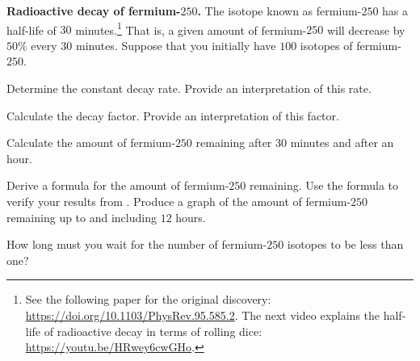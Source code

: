 \documentclass[a4paper,oneside,12pt]{article}
\begin{document}
\begin{exercise}
\textbf{Radioactive decay of fermium-$250$.}
The isotope known as fermium-$250$ has a half-life of $30$
minutes.\footnote{
  See the following paper for the original discovery:
  \url{https://doi.org/10.1103/PhysRev.95.585.2}.  The next video
  explains the half-life of radioactive decay in terms of rolling
  dice:
  \url{https://youtu.be/HRwey6cwGHo}.
}
That is, a given amount of fermium-$250$ will decrease by $50\%$ every
$30$ minutes.  Suppose that you initially have $100$ isotopes of
fermium-$250$.
\begin{packedenum}
\item\label{subex:exponential:fermium250_decay_rate}
  Determine the constant decay rate.  Provide an interpretation of
  this rate.

\item\label{subex:exponential:fermium250_decay_factor}
  Calculate the decay factor.  Provide an interpretation of this
  factor.

\item\label{subex:exponential:fermium250_30minutes_60minutes}
  Calculate the amount of fermium-$250$ remaining after $30$ minutes
  and after an hour.

\item\label{subex:exponential:fermium250_decay_formula}
  Derive a formula for the amount of fermium-$250$ remaining.  Use the
  formula to verify your results
  from .
  Produce a graph of the amount of fermium-$250$ remaining up to and
  including $12$ hours.

\item\label{subex:exponential:fermium250_less_than_1microgram}
  How long must you wait for the number of fermium-$250$ isotopes to
  be less than one?
\end{packedenum}
\end{exercise}
\end{document}
